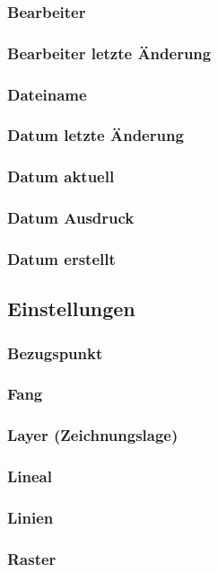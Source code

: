 \documentclass[a4paper]{book}
\begin{document}
			\subsubsection{Bearbeiter} 
			\subsubsection{Bearbeiter letzte Änderung} 
			\subsubsection{Dateiname} 
			\subsubsection{Datum letzte Änderung} 
			\subsubsection{Datum aktuell} 
			\subsubsection{Datum Ausdruck}
			\subsubsection{Datum erstellt} 
		\subsection{Einstellungen}
			\subsubsection{Bezugspunkt} 
			\subsubsection{Fang} 
			\subsubsection{Layer (Zeichnungslage)} 
			\subsubsection{Lineal} 
			\subsubsection{Linien} 
			\subsubsection{Raster} 
\end{document}
